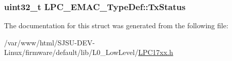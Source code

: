 \subsubsection[{\texorpdfstring{Tx\+Status}{TxStatus}}]{ uint32\+\_\+t L\+P\+C\+\_\+\+E\+M\+A\+C\+\_\+\+Type\+Def\+::\+Tx\+Status}\hypertarget{structLPC__EMAC__TypeDef_a09f0f47c4ff9e7562919c41a240f7b06}{}\label{structLPC__EMAC__TypeDef_a09f0f47c4ff9e7562919c41a240f7b06}


The documentation for this struct was generated from the following file\+:\begin{DoxyCompactItemize}
\item 
/var/www/html/\+S\+J\+S\+U-\/\+D\+E\+V-\/\+Linux/firmware/default/lib/\+L0\+\_\+\+Low\+Level/\hyperlink{LPC17xx_8h}{L\+P\+C17xx.\+h}\end{DoxyCompactItemize}
